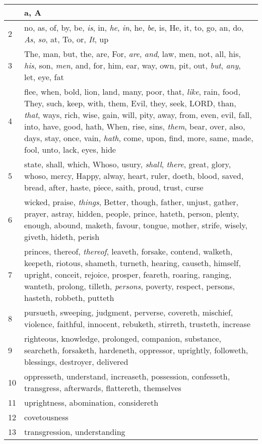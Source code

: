 \begin{center}
\begin{longtable}{l|p{3.75in}}
\hline \hline 
\endlastfoot 
1 & a, A\\ \hline 
2 & no, as, of, by, be, \emph{is}, in, \emph{he}, \emph{in}, he, \emph{be}, is, He, it, to, go, an, do, \emph{As}, \emph{so}, at, To, or, \emph{It}, up\\ \hline 
3 & The, man, but, the, are, For, \emph{are}, \emph{and}, law, men, not, all, his, \emph{his}, son, \emph{men}, and, for, him, ear, way, own, pit, out, \emph{but}, \emph{any}, let, eye, fat\\ \hline 
4 & flee, when, bold, lion, land, many, poor, that, \emph{like}, rain, food, They, such, keep, with, them, Evil, they, seek, LORD, than, \emph{that}, ways, rich, wise, gain, will, pity, away, from, even, evil, fall, into, have, good, hath, When, rise, sins, \emph{them}, bear, over, also, days, stay, once, vain, \emph{hath}, come, upon, find, more, same, made, fool, unto, lack, eyes, hide\\ \hline 
5 & state, shall, which, Whoso, usury, \emph{shall}, \emph{there}, great, glory, whoso, mercy, Happy, alway, heart, ruler, doeth, blood, saved, bread, after, haste, piece, saith, proud, trust, curse\\ \hline 
6 & wicked, praise, \emph{things}, Better, though, father, unjust, gather, prayer, astray, hidden, people, prince, hateth, person, plenty, enough, abound, maketh, favour, tongue, mother, strife, wisely, giveth, hideth, perish\\ \hline 
7 & princes, thereof, \emph{thereof}, leaveth, forsake, contend, walketh, keepeth, riotous, shameth, turneth, hearing, causeth, himself, upright, conceit, rejoice, prosper, feareth, roaring, ranging, wanteth, prolong, tilleth, \emph{persons}, poverty, respect, persons, hasteth, robbeth, putteth\\ \hline 
8 & pursueth, sweeping, judgment, perverse, covereth, mischief, violence, faithful, innocent, rebuketh, stirreth, trusteth, increase\\ \hline 
9 & righteous, knowledge, prolonged, companion, substance, searcheth, forsaketh, hardeneth, oppressor, uprightly, followeth, blessings, destroyer, delivered\\ \hline 
10 & oppresseth, understand, increaseth, possession, confesseth, transgress, afterwards, flattereth, themselves\\ \hline 
11 & uprightness, abomination, considereth\\ \hline 
12 & covetousness\\ \hline 
13 & transgression, understanding\\ \hline 
\end{longtable} 
\end{center} 




 
